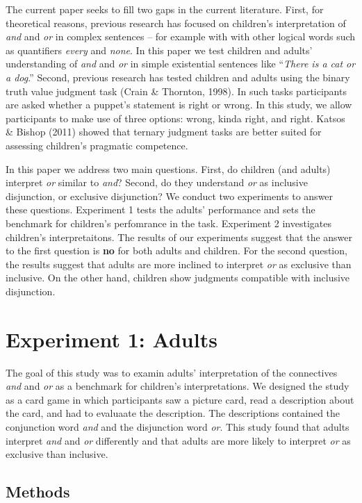 \documentclass[10pt, letterpaper]{article}
\begin{document}
The current paper seeks to fill two gaps in the current literature.
First, for theoretical reasons, previous research has focused on
children's interpretation of \emph{and} and \emph{or} in complex
sentences -- for example with with other logical words such as
quantifiers \emph{every} and \emph{none}. In this paper we test children
and adults' understanding of \emph{and} and \emph{or} in simple
existential sentences like ``\emph{There is a cat or a dog}.'' Second,
previous research has tested children and adults using the binary truth
value judgment task (Crain \& Thornton, 1998). In such tasks
participants are asked whether a puppet's statement is right or wrong.
In this study, we allow participants to make use of three options:
wrong, kinda right, and right. Katsos \& Bishop (2011) showed that
ternary judgment tasks are better suited for assessing children's
pragmatic competence.

In this paper we address two main questions. First, do children (and
adults) interpret \emph{or} similar to \emph{and}? Second, do they
understand \emph{or} as inclusive disjunction, or exclusive disjunction?
We conduct two experiments to answer these questions. Experiment 1 tests
the adults' performance and sets the benchmark for children's
perfomrance in the task. Experiment 2 investigates children's
interpretaitons. The results of our experiments suggest that the answer
to the first question is \textbf{no} for both adults and children. For
the second question, the results suggest that adults are more inclined
to interpret \emph{or} as exclusive than inclusive. On the other hand,
children show judgments compatible with inclusive disjunction.

\section{Experiment 1: Adults}\label{experiment-1-adults}

The goal of this study was to examin adults' interpretation of the
connectives \emph{and} and \emph{or} as a benchmark for children's
interpretations. We designed the study as a card game in which
participants saw a picture card, read a description about the card, and
had to evaluaate the description. The descriptions contained the
conjunction word \emph{and} and the disjunction word \emph{or}. This
study found that adults interpret \emph{and} and \emph{or} differently
and that adults are more likely to interpret \emph{or} as exclusive than
inclusive.

\subsection{Methods}\label{methods}
\end{document}
